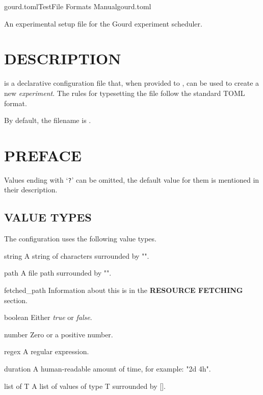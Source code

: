 \documentclass[a4paper,english]{article}
\begin{document}
  \pagestyle{fancy}

  \begin{Name}{5}{gourd.toml}{Test}{File Formats Manual}{gourd.toml}
\begin{adjustwidth}{18pt}{0pt}

       \- An experimental setup file for the Gourd experiment scheduler.

\end{adjustwidth}
  \end{Name}

\begin{adjustwidth}{18pt}{0pt}

  \section{DESCRIPTION}

       is a declarative configuration file that,
      when provided to , can be used to create a new \emph{experiment}.
      The rules for typesetting the file follow the standard TOML format.

      By default, the filename is .

  \section{PREFACE}

      Values ending with `\texttt{?}' can be omitted, the default value
      for them is mentioned in their description.

      \subsection{VALUE TYPES}
          The configuration uses the following value types.

          \begin{Description}[Types]\setlength{\itemsep}{0cm}
              \item[string] A string of characters surrounded by "".
              \item[path] A file path surrounded by "".
              \item[fetched\_path] Information about this is in the \textbf{RESOURCE FETCHING} section.
              \item[boolean] Either \emph{true} or \emph{false}.
              \item[number] Zero or a positive number.
              \item[regex] A regular expression.
              \item[duration] A human-readable amount of time, for example: "2d 4h".
              \item[list of T] A list of values of type T surrounded by [].
          \end{Description}


\end{adjustwidth}
\end{document}
